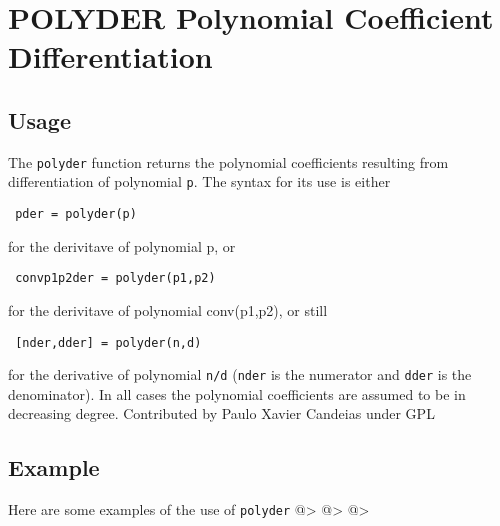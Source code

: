 \section{POLYDER Polynomial Coefficient Differentiation}

\subsection{Usage}

The \verb|polyder| function returns the polynomial coefficients resulting
from differentiation of polynomial \verb|p|. The syntax for its use is either
\begin{verbatim}
 pder = polyder(p)
\end{verbatim}
 for the derivitave of polynomial p, or
\begin{verbatim}
 convp1p2der = polyder(p1,p2)
\end{verbatim}
 for the derivitave of polynomial conv(p1,p2), or still
\begin{verbatim}
 [nder,dder] = polyder(n,d)
\end{verbatim}
for the derivative of polynomial \verb|n/d| (\verb|nder| is the numerator
and \verb|dder| is the denominator). In all cases the polynomial 
coefficients are assumed to be in decreasing degree.
Contributed by Paulo Xavier Candeias under GPL
\subsection{Example}

Here are some examples of the use of \verb|polyder|
@>
@>
@>
